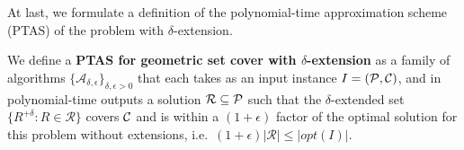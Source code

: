 At last, we formulate a definition of the
polynomial-time approximation scheme (PTAS) of
the problem with $\delta$-extension.

\begin{defi}
We define a \textbf{PTAS for geometric set cover 
with $\delta$-extension} as a family of algorithms
$\{\mathcal{A}_{\delta, \epsilon}\}_{\delta, \epsilon > 0}$ that
each takes as an input instance $I=(\mathcal{P}, \mathcal{C})$,
and in polynomial-time outputs a solution $\mathcal{R} \subseteq \mathcal{P}$
such that the $\delta$-extended set
$\{ R^{+\delta} :  R \in \mathcal{R} \}$ covers $\mathcal{C}$
and is within a $(1+\epsilon)$ factor of the optimal
solution for this problem without
extensions, i.e.~$(1+\epsilon)|\mathcal{R}| \le |opt(I)|$.

\end{defi}
